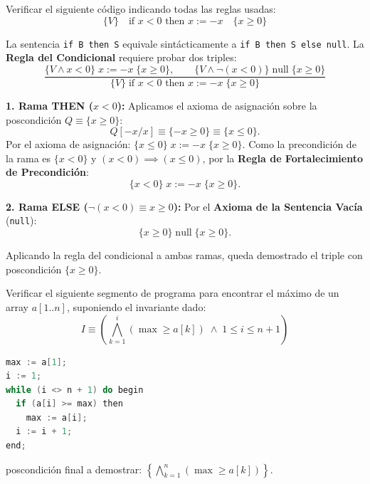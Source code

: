 \begin{ejercicio}
Verificar el siguiente código indicando todas las reglas usadas:
\[
\{V\} \quad \text{if } x < 0 \text{ then } x := -x \quad \{x \ge 0\}
\]
\end{ejercicio}

\begin{solucion}
La sentencia \texttt{if B then S} equivale sintácticamente a \texttt{if B then S else null}.
La \textbf{Regla del Condicional} requiere probar dos triples:
\[
\frac{\{V \land x < 0\} \; x := -x \; \{x \ge 0\}, \qquad \{V \land \neg(x < 0)\} \; \text{null} \; \{x \ge 0\}}{\{V\} \; \text{if } x < 0 \text{ then } x := -x \; \{x \ge 0\}}
\]

\textbf{1. Rama THEN ($x < 0$):}
Aplicamos el axioma de asignación sobre la poscondición $Q \equiv \{x \ge 0\}$:
\[
Q[-x / x] \equiv \{-x \ge 0\} \equiv \{x \le 0\}.
\]
Por el axioma de asignación: $\{x \le 0\} \; x := -x \; \{x \ge 0\}$.
Como la precondición de la rama es $\{x < 0\}$ y $(x < 0) \implies (x \le 0)$, por la \textbf{Regla de Fortalecimiento de Precondición}:
\[
\{x < 0\} \; x := -x \; \{x \ge 0\}.
\]

\textbf{2. Rama ELSE ($\neg(x < 0) \equiv x \ge 0$):}
Por el \textbf{Axioma de la Sentencia Vacía} (\texttt{null}):
\[
\{x \ge 0\} \; \text{null} \; \{x \ge 0\}.
\]

Aplicando la regla del condicional a ambas ramas, queda demostrado el triple con poscondición $\{x \ge 0\}$.
\end{solucion}

\begin{ejercicio}
Verificar el siguiente segmento de programa para encontrar el máximo de un array $a[1..n]$, suponiendo el invariante dado:
\[
I \equiv \left( \bigwedge_{k=1}^i (\max \ge a[k]) \;\land\; 1 \le i \le n + 1 \right)
\]

\begin{lstlisting}[language=C++]
max := a[1];
i := 1;
while (i <> n + 1) do begin
  if (a[i] >= max) then
    max := a[i];
  i := i + 1;
end;
\end{lstlisting}
poscondición final a demostrar: $\displaystyle \left\{ \bigwedge_{k=1}^n (\max \ge a[k]) \right\}$.
\end{ejercicio}

